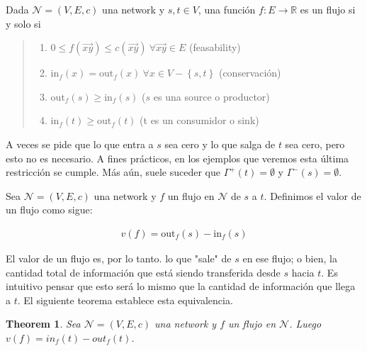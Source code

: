\documentclass[a4paper, 12pt]{article}
\newtheorem{theorem}{Theorem}
\newtheorem{theorem}{Theorem}
\begin{document}
\begin{definition}
    Dada $\mathcal{N} = (V, E, c)$ una network y $s, t \in V$, una función $f
    :E \to \mathbb{R}$ es un flujo si y solo si 

    \begin{quote}
        
    \begin{enumerate}
        \item $0 \leq f(\overrightarrow{xy}) \leq c(\overrightarrow{xy}) ~ \forall \overrightarrow{xy} \in E$
            (feasability)
        \item $\text{in}_f(x) = \text{out}_f(x) ~ \forall x \in V - \left\{ s, t
            \right\} $ (conservación) 
        \item $\text{out}_f(s) \geq \text{in}_f(s)$ ($s$ es una source o
            productor)
        \item $\text{in}_f(t) \geq \text{out}_f(t)$ (t es un consumidor o sink)
    \end{enumerate}
    \end{quote}

\end{definition}

A veces se pide que lo que entra a $s$ sea cero y lo que salga de $t$ sea cero,
pero esto no es necesario. A fines prácticos, en los ejemplos que veremos esta
última restricción se cumple. Más aún, suele suceder que $\Gamma^{+}(t) =
\emptyset$ y $\Gamma^{-}(s) =\emptyset$.

\begin{definition}
    Sea $\mathcal{N} = (V, E, c)$ una network y $f$ un flujo en $\mathcal{N}$
    de $s$ a $t$. Definimos el valor de un flujo como sigue:

    \begin{align*}
        v(f) = \text{out}_f(s) - \text{in}_f(s)
    \end{align*}
\end{definition}

El valor de un flujo es, por lo tanto. lo que "sale" de $s$ en ese flujo; o
bien, la cantidad total de información que está siendo transferida desde $s$
hacia $t$. Es intuitivo pensar que esto será lo mismo que la cantidad de
información que llega a $t$. El siguiente teorema establece esta equivalencia.

\begin{theorem}
    Sea $\mathcal{N} = (V, E, c)$ una network y $f$ un flujo en $\mathcal{N}$.
    Luego $v(f) = in_f(t) - out_f(t)$.
\end{theorem}
\end{document}
